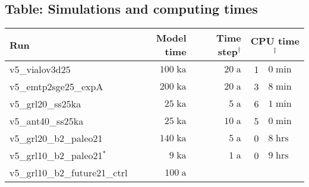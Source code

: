 \documentclass[12pt,a4paper]{article}
\begin{document}
\begin{appendix}
\section{Table: Simulations and computing times}
\label{sect_table}

\begin{table}[ht]
\centering
\begin{tabular}{lrrr@{.}l} \hline
Run & Model time & Time step$^\dagger$ 
                 & \multicolumn{2}{c}{CPU time$^\ddagger$} \\ \hline
v5\_vialov3d25                       &  $100\;\mathrm{ka}$\hspace*{1.0em}
                                     &   $20\;\mathrm{ a}$\hspace*{1.0em}
                                     &  1&$0\;\mathrm{min}$ \\
v5\_emtp2sge25\_expA                 &  $200\;\mathrm{ka}$\hspace*{1.0em}
                                     &   $20\;\mathrm{ a}$\hspace*{1.0em}
                                     &  3&$8\;\mathrm{min}$ \\
v5\_grl20\_ss25ka                    &   $25\;\mathrm{ka}$\hspace*{1.0em}
                                     &    $5\;\mathrm{ a}$\hspace*{1.0em}
                                     &  6&$1\;\mathrm{min}$ \\
v5\_ant40\_ss25ka                    &   $25\;\mathrm{ka}$\hspace*{1.0em}
                                     &   $10\;\mathrm{ a}$\hspace*{1.0em}
                                     &  5&$0\;\mathrm{min}$ \\ \hline
v5\_grl20\_b2\_paleo21               &  $140\;\mathrm{ka}$\hspace*{1.0em}
                                     &    $5\;\mathrm{ a}$\hspace*{1.0em}
                                     &  0&$8\;\mathrm{hrs}$ \\
v5\_grl10\_b2\_paleo21$^\ast$        &    $9\;\mathrm{ka}$\hspace*{1.0em}
                                     &    $1\;\mathrm{ a}$\hspace*{1.0em}
                                     &  0&$9\;\mathrm{hrs}$ \\
v5\_grl10\_b2\_future21\_ctrl        &  $100\;\mathrm{ a}$\hspace*{1.47em}

\end{tabular}
\end{table}
\end{appendix}
\end{document}
